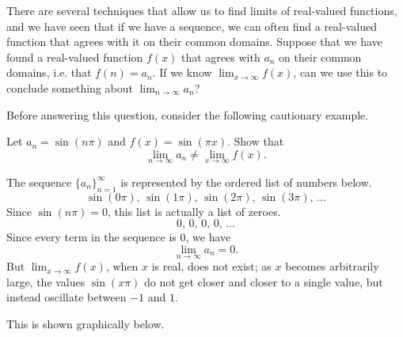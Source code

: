 \documentclass{ximera}
\begin{document}
There are several techniques that allow us to find limits of real-valued functions, and we have seen that if we have a sequence, we can often find a real-valued function that agrees with it on their common domains.   Suppose that we have found a real-valued function $f(x)$ that agrees with $a_n$ on their common domains, i.e. that $f(n)=a_n$.  If we know  $\lim_{x\to\infty} f(x)$, can we use this to conclude something about $\lim_{n \to \infty} a_n$?  

Before answering this question, consider the following cautionary example.

\begin{example}
  Let $a_n = \sin(n\pi)$ and $f(x) = \sin(\pi x)$. Show that
  \[
  \lim_{n\to\infty} a_n \ne \lim_{x\to \infty}f(x).
  \]
  \begin{explanation}
  The sequence $\{a_n\}_{n=1}^{\infty}$ is represented by the ordered  list of numbers below.
  \[
  \sin(0\pi),\, \sin(1\pi),\, \sin(2\pi),\,\sin(3\pi),\,\ldots
  \]
Since $\sin(n\pi)=0$, this list is actually a list of zeroes.
  \[
  0,\, 0 , \, 0 ,\,0,\,\ldots
  \]
Since every term in the sequence is $0$, we have
\[
\lim_{n\to\infty} a_n = 0. 
\]
But $\lim_{x\to\infty}f(x)$, when $x$ is real, does not exist; as $x$
becomes arbitrarily large, the values $\sin(x\pi)$ do not get closer and
closer to a single value, but instead oscillate between $-1$ and $1$.

This is shown graphically below.

\begin{image}
\end{image}


  \end{explanation}
\end{example}
\end{document}

